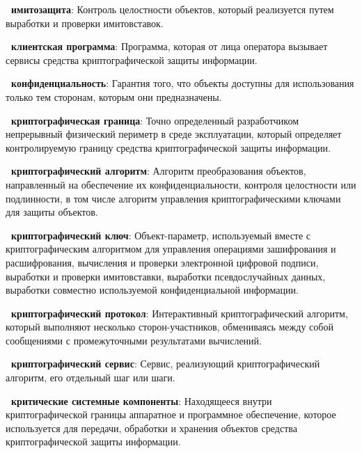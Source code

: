 {\bf \thedefctr~имитозащита}:
Контроль целостности объектов, 
который реализуется путем выработки и проверки имитовставок.



{\bf \thedefctr~клиентская программа}:
Программа, которая от лица оператора вызывает сервисы
средства криптографической защиты информации.

{\bf \thedefctr~конфиденциальность}:
Гарантия того, что объекты доступны для использования
только тем сторонам, которым они предназначены.

{\bf \thedefctr~криптографическая граница}: 
Точно определенный разработчиком непрерывный физический 
периметр в среде эксплуатации, 
который определяет контролируемую границу средства 
криптографической защиты информации.

{\bf \thedefctr~криптографический алгоритм}:
Алгоритм преобразования объектов,
направленный на обеспечение их конфиденциальности,
контроля целостности или подлинности,
в том числе алгоритм управления криптографическими
ключами для защиты объектов.


{\bf \thedefctr~криптографический ключ}: 
Объект-параметр, используемый вместе с криптографическим алгоритмом 
для управления операциями зашифрования и расшифрования,
вычисления и проверки электронной цифровой подписи,
выработки и проверки имитовставки,
выработки псевдослучайных данных,
выработки совместно используемой конфиденциальной информации.


{\bf \thedefctr~криптографический протокол}:
Интерактивный криптографический алгоритм, который выполняют 
несколько сторон-участников, обмениваясь между собой сообщениями
с промежуточными результатами вычислений.

{\bf \thedefctr~криптографический сервис}:
Сервис, реализующий криптографический алгоритм, его отдельный шаг или 
шаги. 

{\bf \thedefctr~критические системные компоненты}:
Находящееся внутри криптографической границы 
аппаратное и программное обеспечение, которое используется
для передачи, обработки и хранения объектов
средства криптографической защиты информации.

